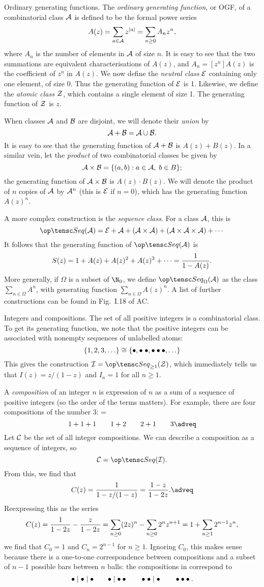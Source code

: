 \boldlabel Ordinary generating functions. The {\it ordinary generating function}, or OGF, of a combinatorial
class ${\cal A}$ is defined to be the formal power series
$$A(z) = \sum_{a\in {\cal A}} z^{|a|} = \sum_{n\geq 0} A_nz^n,$$
where $A_n$ is the number of elements in ${\cal A}$ of size $n$. It is easy to see that the two summations
are equivalent characterisations of $A(z)$, and $A_n = [z^n]A(z)$ is the coefficient of $z^n$ in $A(z)$.
We now define the {\it neutral class} ${\cal E}$ containing only one element, of size 0.
Thus the generating function of ${\cal E}$ is 1.
Likewise, we define the {\it atomic class} ${\cal Z}$, which contains a single element of size 1.
The generating function of ${\cal Z}$ is $z$.

When classes ${\cal A}$ and ${\cal B}$ are disjoint, we will denote their {\it union} by
$${\cal A} + {\cal B} = {\cal A}\cup{\cal B}.$$
It is easy to see that the generating function of ${\cal A} + {\cal B}$ is $A(z) + B(z)$.
In a similar vein, let the {\it product} of two combinatorial classes be given by
$${\cal A}\times{\cal B} = \{(a,b) : a\in {\cal A},\; b\in B\};$$
the generating function of ${\cal A}\times{\cal B}$ is $A(z)\cdot B(z)$. We will denote the product of
$n$ copies of ${\cal A}$ by ${\cal A}^n$ (this is ${\cal E}$ if $n=0$), which has the generating function $A(z)^n$.

A more complex construction is the {\it sequence class}. For a class ${\cal A}$, this is
$$\Seq(\A) = \E + \A + (\A\times\A) + (\A\times\A\times\A) + \cdots$$
It follows that the generating function of $\Seq(\A)$ is
$$S(z) = 1 + A(z) + A(z)^2 + A(z)^3 + \cdots = {1\over 1-A(z)}.$$
More generally, if $\Omega$ is a subset of $\N_0$, we define $\Seq_\Omega(\A)$ as the class
$\sum_{n\in \Omega} A^n$, with generating function $\sum_{n\in\Omega} A(z)^n$.
A list of further constructions can be found in Fig.~I.18 of AC.
\medskip

\boldlabel Integers and compositions. The set of all positive integers is a combinatorial class.
To get its generating function, we note that the positive integers can be associated with nonempty sequences
of unlabelled atoms:
$$\{1,2,3,\ldots\} \cong \{\bullet,\bullet\;\bullet,\bullet\bullet\bullet,\ldots\}$$
This gives the construction ${\cal I} = \Seq_{\geq 1}(\Z)$, which immediately tells us that
$I(z) = z/(1-z)$ and $I_n = 1$ for all $n\geq 1$.

A {\it composition} of an integer $n$ is expression of $n$ as a sum of a sequence of positive integers
(so the order of the terms matters). For example, there are four compositions of the number 3:
\newcount\threecomp
\threecomp=\eqcount
$$1 + 1 + 1\qquad1 + 2\qquad2 + 1\qquad3\adveq$$
Let ${\cal C}$ be the set of all integer compositions. We can describe a composition as a sequence of integers, so
$$\C = \Seq(\I).$$
From this, we find that
$$C(z) = {1\over 1 - z/(1-z)} = {1-z\over 1-2z}.\adveq$$
Reexpressing this as the series
$$C(z) = {1\over 1-2z}-{z\over 1-2z}
       =\sum_{n\geq 0} (2z)^n - \sum_{n\geq 0} 2^nz^{n+1}= 1+\sum_{n\geq 1} 2^{n-1}z^n,$$
we find that $C_0 = 1$ and $C_n = 2^{n-1}$ for $n\geq 1$. Ignoring $C_0$,
this makes sense because there is a one-to-one
correspondence between compositions and a subset of $n-1$ possible bars between $n$ balls:
the compositions in  correspond to
$$\bullet\mid\bullet\mid\bullet\qquad \bullet\mid\bullet\bullet\qquad \bullet\;\bullet\mid\bullet\qquad \bullet\bullet\bullet.$$
\medskip

